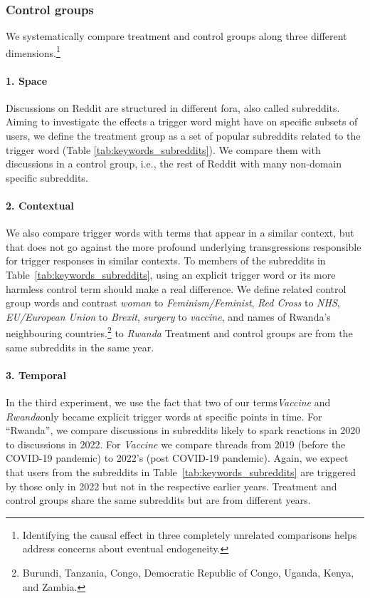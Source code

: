 \subsubsection{Control groups}
We systematically compare treatment and control groups along three different dimensions.\footnote{Identifying the causal effect in three completely unrelated comparisons helps address concerns about eventual endogeneity.}

\paragraph{1. Space}
Discussions on Reddit are structured in different fora, also called subreddits. Aiming to investigate the effects a trigger word might have on specific subsets of users, we define the treatment group as a set of popular subreddits related to the trigger word (Table \ref{tab:keywords_subreddits}). We compare them with discussions in a control group, i.e., the rest of Reddit with many non-domain specific subreddits. 

\paragraph{2. Contextual} 
We also compare trigger words with terms that appear in a similar context, but that does not go against the more profound underlying transgressions responsible for trigger responses in similar contexts. To members of the subreddits in Table~\ref{tab:keywords_subreddits}, using an explicit trigger word or its more harmless control term should make a real difference. We define related control group words and contrast \textit{woman} to \textit{Feminism/Feminist}, \textit{Red Cross} to \textit{NHS}, \textit{EU/European Union} to \textit{Brexit}, \textit{surgery} to \textit{vaccine}, and names of Rwanda's neighbouring countries.\footnote{Burundi, Tanzania, Congo, Democratic Republic of Congo, Uganda, Kenya, and Zambia.} to \textit{Rwanda} Treatment and control groups are from the same subreddits in the same year.

\paragraph{3. Temporal}
In the third experiment, we use the fact that two of our terms\textemdash \textit{Vaccine} and \textit{Rwanda}\textemdash only became explicit trigger words at specific points in time. For ``Rwanda'', we compare discussions in subreddits likely to spark reactions in 2020 to discussions in 2022. For \textit{Vaccine} we compare threads from 2019 (before the COVID-19 pandemic) to 2022's (post COVID-19 pandemic). Again, we expect that users from the subreddits in Table~\ref{tab:keywords_subreddits} are triggered by those only in 2022 but not in the respective earlier years. Treatment and control groups share the same subreddits but are from different years.


